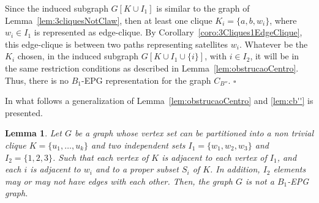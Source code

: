 \documentclass[9pt]{entcs}
\newtheorem{lema}{Lemma}[section]
\begin{document}
\begin{pf}
Since the induced subgraph $G[K\cup I_1]$ is similar to the graph of Lemma~\ref{lem:3cliquesNotClaw}, then at least one clique $K_i = \{a,b,w_i\}$, where $w_i \in I_1$ is represented as edge-clique. By Corollary~\ref{coro:3Cliques1EdgeClique}, this edge-clique is between two paths representing satellites $w_i$. Whatever be  the $K_i$ chosen, in the induced subgraph $G[K\cup I_1 \cup \{i\}]$, with $i\in I_2$, it will be in the same restriction conditions as described in Lemma~\ref{lem:obstrucaoCentro}. Thus, there is no $B_1$-EPG representation for the graph $C_{B''}$.
 $\square$\end{pf} 

In what follows a generalization of Lemma~\ref{lem:obstrucaoCentro} and \ref{lem:cb''} is presented.

\begin{lema}\label{lem:obstrucaoGeneralizada}
Let $G$ be a graph whose vertex set  can be
partitioned into a non trivial clique $K=\{u_1,\ldots,u_k\}$ and two independent sets $I_1=\{w_1,w_2,w_3\}$  and
$I_2=\{1,2,3\}$. Such that each vertex of $K$ is adjacent to each vertex of $I_1$, and each  $i$ is adjacent to $w_i$ and to a proper subset $S_i$ of $K$. In addition, $I_2$ elements may or may not have edges with each other. Then, the graph $G$ is not a $B_1$-EPG graph.
\end{lema}
\end{document}
